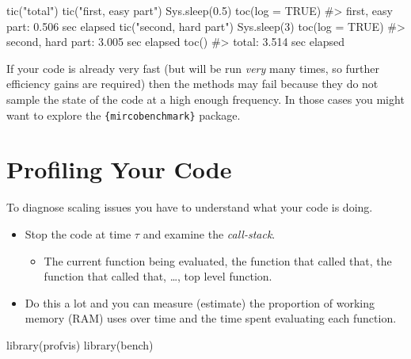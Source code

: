 \documentclass[
  letterpaper,
  DIV=11,
  numbers=noendperiod]{scrreprt}
\newenvironment{Shaded}{\begin{snugshade}}{\end{snugshade}}
\newcommand{\AttributeTok}[1]{\textcolor[rgb]{0.40,0.45,0.13}{#1}}
\newcommand{\CommentTok}[1]{\textcolor[rgb]{0.37,0.37,0.37}{#1}}
\newcommand{\ConstantTok}[1]{\textcolor[rgb]{0.56,0.35,0.01}{#1}}
\newcommand{\DecValTok}[1]{\textcolor[rgb]{0.68,0.00,0.00}{#1}}
\newcommand{\FloatTok}[1]{\textcolor[rgb]{0.68,0.00,0.00}{#1}}
\newcommand{\FunctionTok}[1]{\textcolor[rgb]{0.28,0.35,0.67}{#1}}
\newcommand{\NormalTok}[1]{\textcolor[rgb]{0.00,0.23,0.31}{#1}}
\newcommand{\StringTok}[1]{\textcolor[rgb]{0.13,0.47,0.30}{#1}}
\providecommand{\tightlist}{%
  \setlength{\itemsep}{0pt}\setlength{\parskip}{0pt}}\usepackage{longtable,booktabs,array}
\begin{document}
\begin{Shaded}
\begin{Highlighting}[]
\FunctionTok{tic}\NormalTok{(}\StringTok{"total"}\NormalTok{)}
\FunctionTok{tic}\NormalTok{(}\StringTok{"first, easy part"}\NormalTok{)}
\FunctionTok{Sys.sleep}\NormalTok{(}\FloatTok{0.5}\NormalTok{)}
\FunctionTok{toc}\NormalTok{(}\AttributeTok{log =} \ConstantTok{TRUE}\NormalTok{)}
\CommentTok{\#\textgreater{} first, easy part: 0.506 sec elapsed}
\FunctionTok{tic}\NormalTok{(}\StringTok{"second, hard part"}\NormalTok{)}
\FunctionTok{Sys.sleep}\NormalTok{(}\DecValTok{3}\NormalTok{)}
\FunctionTok{toc}\NormalTok{(}\AttributeTok{log =} \ConstantTok{TRUE}\NormalTok{)}
\CommentTok{\#\textgreater{} second, hard part: 3.005 sec elapsed}
\FunctionTok{toc}\NormalTok{()}
\CommentTok{\#\textgreater{} total: 3.514 sec elapsed}
\end{Highlighting}
\end{Shaded}

If your code is already very fast (but will be run \emph{very} many
times, so further efficiency gains are required) then the methods may
fail because they do not sample the state of the code at a high enough
frequency. In those cases you might want to explore the
\texttt{\{mircobenchmark\}} package.

\section{Profiling Your Code}\label{profiling-your-code}

To diagnose scaling issues you have to understand what your code is
doing.

\begin{itemize}
\item
  Stop the code at time \(\tau\) and examine the \emph{call-stack}.

  \begin{itemize}
  \tightlist
  \item
    The current function being evaluated, the function that called that,
    the function that called that, \ldots, top level function.
  \end{itemize}
\item
  Do this a lot and you can measure (estimate) the proportion of working
  memory (RAM) uses over time and the time spent evaluating each
  function.
\end{itemize}

\begin{Shaded}
\begin{Highlighting}[]
\FunctionTok{library}\NormalTok{(profvis)}
\FunctionTok{library}\NormalTok{(bench)}
\end{Highlighting}
\end{Shaded}
\end{document}
